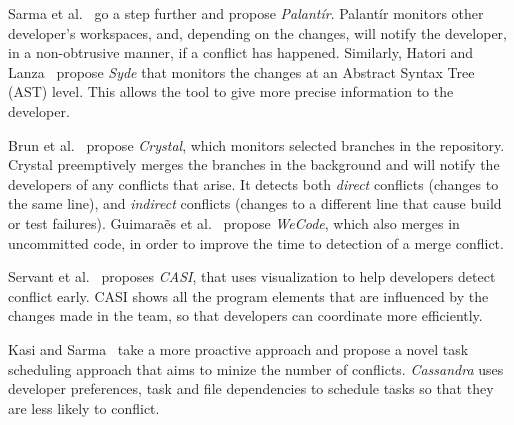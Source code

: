 Sarma et al.~\cite{palantir, sarma_palantir:_2003} go a step further and propose \emph{Palant\'{i}r}.
Palant\'{i}r monitors other developer's workspaces, and, depending on the changes, will notify the developer, in a non-obtrusive manner, if a conflict has happened.
Similarly, Hatori and Lanza~\cite{hattori2010syde} propose \emph{Syde} that monitors the changes at an Abstract Syntax Tree (AST) level.
This allows the tool to give more precise information to the developer.

Brun et al.~\cite{Brun2011} propose \emph{Crystal}, which monitors selected branches in the repository. 
Crystal preemptively merges the branches in the background and will notify the developers of any conflicts that arise. 
It detects both \emph{direct} conflicts (changes to the same line), and \emph{indirect} conflicts (changes to a different line that cause build or test failures).
Guimara\~{e}s et al.~\cite{Guimaraes} propose \emph{WeCode}, which also merges in uncommitted code, in order to improve the time to detection of a merge conflict.

Servant et al.~\cite{servant_casi:_2010} proposes \emph{CASI}, that uses visualization to help developers detect conflict early.
CASI shows all the program elements that are influenced by the changes made in the team, so that developers can coordinate more efficiently.

Kasi and Sarma~\cite{kasi_cassandra:_2013} take a more proactive approach and propose a novel task scheduling approach that aims to minize the number of conflicts. 
\emph{Cassandra} uses developer preferences, task and file dependencies to schedule tasks so that they are less likely to conflict.

